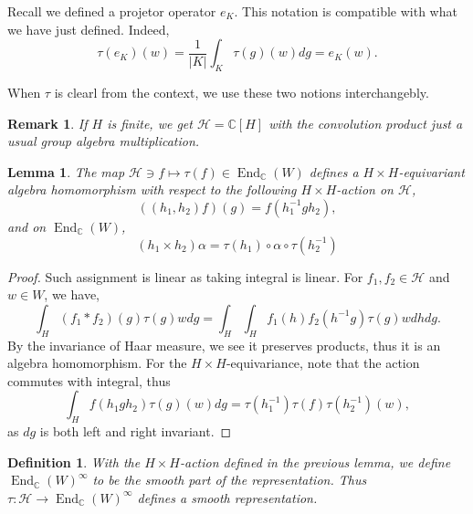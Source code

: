 \documentclass[8pt]{article}
\newtheorem{definition}{Definition}[section]
\newtheorem{lemma}{Lemma}[section]
\newtheorem{remark}{Remark}[section]
\DeclareMathOperator{\End}{End}
\newcommand{\C}[0]{\mathbb{C}}
\newcommand{\hecke}[0]{\mathscr{H}}
\begin{document}
Recall we defined a projetor operator $e_K$. This notation is compatible with what we have just defined. Indeed,
\begin{equation*}
  \tau(e_K)(w) = {\frac 1 {\vert K \vert}}\int_K\tau(g)(w)dg = e_K(w).
\end{equation*}

When $\tau$ is clearl from the context, we use these two notions interchangebly.

\begin{remark}
  If $H$ is finite, we get $\hecke =\C[H]$ with the convolution product just a usual group algebra multiplication.
\end{remark}

\begin{lemma}
The map $\hecke\ni f\mapsto\tau(f)\in \End_\C(W)$ defines a $H\times H$-equivariant algebra homomorphism with respect to the following $H\times H$-action on $\hecke$,
\begin{equation*}
  ((h_1,h_2)f)(g) = f(h_1^{-1}gh_2),
\end{equation*}
and on $\End_\C(W)$,
\begin{equation*}
  (h_1\times h_2)\alpha = \tau(h_1)\circ\alpha\circ\tau(h_2^{-1})
\end{equation*}
\label{lemma_hecke_action}
\end{lemma}

\begin{proof}
  Such assignment is linear as taking integral is linear. For $f_1,f_2\in\hecke$ and $w\in W$, we have,
  \begin{equation*}
    \int_H (f_1\ast f_2)(g)\tau(g)wdg = \int_H\int_H f_1(h)f_2(h^{-1}g)\tau(g)wdhdg.
  \end{equation*}
  By the invariance of Haar measure, we see it preserves products, thus it is an algebra homomorphism. For the $H\times H$-equivariance, note that the action commutes with integral, thus 
  \begin{equation*}
    \int_H f(h_1gh_2)\tau(g)(w)dg = \tau(h_1^{-1})\tau(f)\tau(h_2^{-1})(w),
  \end{equation*}
  as $dg$ is both left and right invariant.
\end{proof}

\begin{definition}
  With the $H\times H$-action defined in the previous lemma, we define $\End_\C(W)^\infty$ to be the smooth part of the representation. Thus $\tau:\hecke\to\End_\C(W)^\infty$ defines a smooth representation.
\end{definition}
\end{document}
